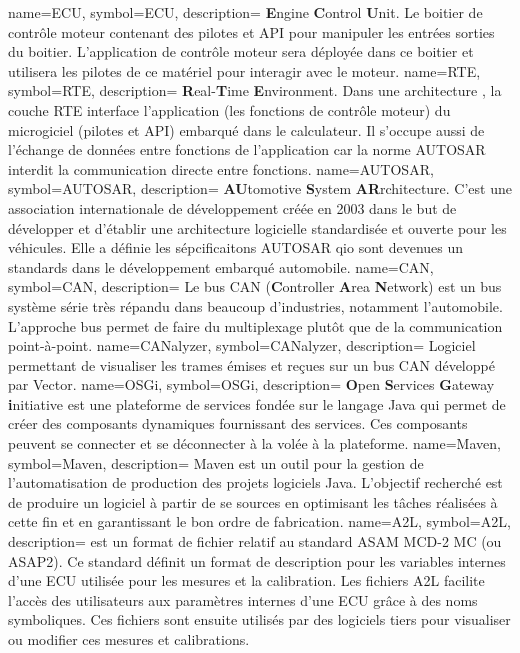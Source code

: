   {
	name=ECU,
	symbol=ECU,
	description=
	{
	  {\bf E}ngine {\bf C}ontrol {\bf U}nit. Le boitier de contrôle moteur contenant des
	  pilotes et API pour manipuler les entrées sorties du boitier. L'application de contrôle
	  moteur sera déployée dans ce boitier et utilisera les pilotes de ce matériel pour interagir avec le moteur.
	}
}
  {
	name=RTE,
	symbol=RTE,
	description=
	{
	  {\bf R}eal-{\bf T}ime {\bf E}nvironment. Dans une architecture
	  , la couche RTE interface l'application (les fonctions de
	  contrôle moteur) du microgiciel (pilotes et API) embarqué dans le
	  calculateur. Il s'occupe aussi de l'échange de données entre fonctions de
	  l'application car la norme AUTOSAR interdit la communication directe entre
	  fonctions.
	}
}
  {
	name=AUTOSAR,
	symbol=AUTOSAR,
	description=
	{
	  {\bf AU}tomotive {\bf S}ystem {\bf AR}rchitecture. C'est une association
	  internationale de développement créée en 2003 dans le but de développer et
	  d'établir une architecture logicielle standardisée et ouverte pour les
	  véhicules. Elle a définie les sépcificaitons AUTOSAR qio sont devenues un
	  standards dans le développement embarqué automobile.
	}
}
  {
	name=CAN,
	symbol=CAN,
	description=
	{
	  Le bus CAN ({\bf C}ontroller {\bf A}rea {\bf N}etwork) est un bus système série
	  très répandu dans beaucoup d'industries, notamment l'automobile. L'approche
	  bus permet de faire du multiplexage plutôt que de la communication point-à-point.
	}
}
  {
	name=CANalyzer,
	symbol=CANalyzer,
	description=
	{
	  Logiciel permettant de visualiser les trames émises et reçues sur un bus CAN développé par Vector. 
	}
}
  {
	name=OSGi,
	symbol=OSGi,
	description=
	{
	  {\bf O}pen {\bf S}ervices {\bf G}ateway {\bf i}nitiative est une plateforme de services
	  fondée sur le langage Java qui permet de créer des composants dynamiques fournissant
	  des services. Ces composants peuvent se connecter et se déconnecter \og à la volée
	  \fg{} à la plateforme.
	}
}
  {
	name=Maven,
	symbol=Maven,
	description=
	{
	  Maven est un outil pour la gestion de l'automatisation de production des projets logiciels
	  Java. L'objectif recherché est de produire un logiciel à partir de se sources en optimisant
	  les tâches réalisées à cette fin et en garantissant le bon ordre de fabrication.
	}
}
  {
	name=A2L,
	symbol=A2L,
	description=
	{
	  est un format de fichier relatif au standard ASAM MCD-2 MC (ou ASAP2). Ce
	  standard définit un format de description pour les variables internes
	  d'une ECU utilisée pour les mesures et la calibration. Les fichiers A2L
	  facilite l'accès des utilisateurs aux paramètres internes d'une ECU grâce
	  à des noms symboliques. Ces fichiers sont ensuite utilisés par des
	  logiciels tiers pour visualiser ou modifier ces mesures et calibrations.
	}
}
